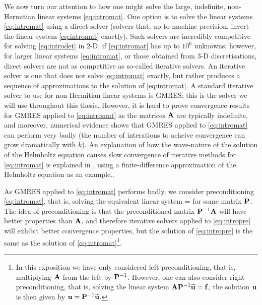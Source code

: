 We now turn our attention to how one might solve the large, indefinite, non-Hermitian linear systems \eqref{eq:intromat}. One option is to solve the linear systems \eqref{eq:intromat} using a direct solver (solvers that, up to machine precision, invert the linear system \eqref{eq:intromat} exactly). Such solvers are incredibly competitive for solving \eqref{eq:introdet} in 2-D, if \eqref{eq:intromat} has up to $10^6$ unknowns; however, for larger linear systems \eqref{eq:intromat}, or those obtained from 3-D discretisations, direct solvers are not as competitive as so-called iterative solvers. An iterative solver is one that does not solve \eqref{eq:intromat} exactly, but rather produces a sequence of approximations to the solution of \eqref{eq:intromat}. A standard iterative solver to use for non-Hermitian linear systems is GMRES; this is the solver we will use throughout this thesis. However, it is hard to prove convergence results for GMRES applied to \eqref{eq:intromat} as the matrices $\mathbf{A}$ are typically indefinite, and moreover, numerical evidence shows that GMRES applied to \eqref{eq:intromat} can perform very badly (the number of interations to acheive convergence can grow dramatically with $k$). An explanation of how the wave-nature of the solution of the Helmholtz equation causes slow convergence of iterative methods for \eqref{eq:intromat} is explained in \cite[Section 2.1]{ErGa:12}, using a finite-difference approximation of the Helmholtz equation as an example..

As GMRES applied to \eqref{eq:intromat} performs badly, we consider preconditioning \eqref{eq:intromat}, that is, solving the equivalent linear system
\beq\label{eq:intropre}
\PmatI\Amat \bu = \PmatI \bff
\eeq
for some matrix $\mathbf{P}$. The idea of preconditioning is that the preconditioned matrix $\mathbf{P}^{-1} \mathbf{A}$ will have better properties than $\mathbf{A},$ and therefore iterative solvers applied to \eqref{eq:intropre} will exhibit better convergence properties, but the solution of \eqref{eq:intropre} is the same as the solution of \eqref{eq:intromat}\footnote{In this exposition we have only considered left-preconditioning, that is, multiplying $\mathbf{A}$ from the left by $\mathbf{P}^{-1}$. However, one can also-consider right-preconditioning, that is, solving the linear system $\mathbf{A} \mathbf{P}^{-1} \widetilde{\mathbf{u}} = \mathbf{f},$ the solution $\mathbf{u}$ is then given by $\mathbf{u} = \mathbf{P}^{-1} \widetilde{\mathbf{u}}.$}.

